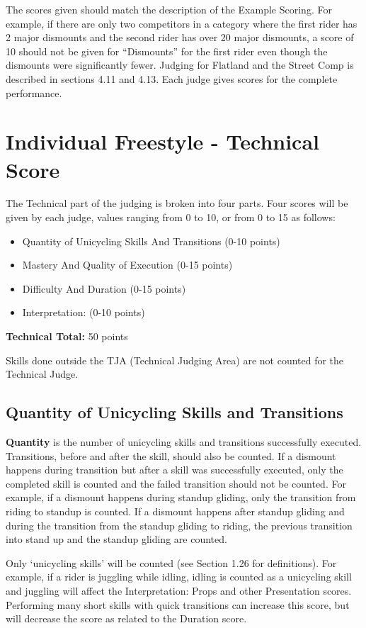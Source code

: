 The scores given should match the description of the Example Scoring.
For example, if there are only two competitors in a category where the first rider has 2 major dismounts and the second rider has over 20 major dismounts, a score of 10 should not be given for ``Dismounts'' for the first rider even though the dismounts were significantly fewer.
Judging for Flatland and the Street Comp is described in sections 4.11 and 4.13. %
Each judge gives scores for the complete performance.

\section{Individual Freestyle - Technical Score \label{sec:freestyle_individual-technical-score}}
The Technical part of the judging is broken into four parts.
Four scores will be given by each judge, values ranging from 0 to 10, or from 0 to 15 as follows: 
\begin{itemize}
\item Quantity of Unicycling Skills And Transitions (0-10 points) 
\item Mastery And Quality of Execution (0-15 points) 
\item Difficulty And Duration (0-15 points) 
\item Interpretation: (0-10 points)
\end{itemize}
\textbf{Technical Total:} 50 points

Skills done outside the TJA (Technical Judging Area) are not counted for the Technical Judge.

\subsection{Quantity of Unicycling Skills and Transitions}
\textbf{Quantity} is the number of unicycling skills and transitions successfully executed.
Transitions, before and after the skill, should also be counted.
If a dismount happens during transition but after a skill was successfully executed, only the completed skill is counted and the failed transition should not be counted.
For example, if a dismount happens during standup gliding, only the transition from riding to standup is counted.
If a dismount happens after standup gliding and during the transition from the standup gliding to riding, the previous transition into stand up and the standup gliding are counted.

Only `unicycling skills' will be counted (see Section 1.26 for definitions).
For example, if a rider is juggling while idling, idling is counted as a unicycling skill and juggling will affect the Interpretation: Props and other Presentation scores.
Performing many short skills with quick transitions can increase this score, but will decrease the score as related to the Duration score.

